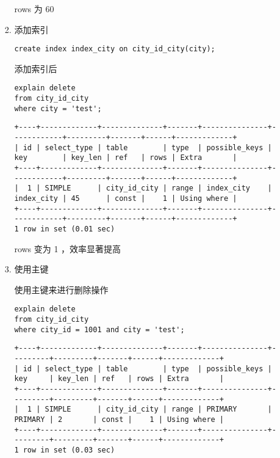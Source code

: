 \documentclass[11pt]{article}
\begin{document}
\begin{itemize}
\begin{enumerate}
\begin{enumerate}
rows 为 60

\item 添加索引

\begin{lstlisting}
create index index_city on city_id_city(city);
\end{lstlisting}

添加索引后

\begin{lstlisting}
explain delete
from city_id_city
where city = 'test';
\end{lstlisting}

\begin{verbatim}
+----+-------------+--------------+-------+---------------+------------+---------+-------+------+-------------+
| id | select_type | table        | type  | possible_keys | key        | key_len | ref   | rows | Extra       |
+----+-------------+--------------+-------+---------------+------------+---------+-------+------+-------------+
|  1 | SIMPLE      | city_id_city | range | index_city    | index_city | 45      | const |    1 | Using where |
+----+-------------+--------------+-------+---------------+------------+---------+-------+------+-------------+
1 row in set (0.01 sec)
\end{verbatim}

rows 变为 1 ，效率显著提高

\item 使用主键

使用主键来进行删除操作

\begin{lstlisting}
explain delete
from city_id_city
where city_id = 1001 and city = 'test';
\end{lstlisting}

\begin{verbatim}
+----+-------------+--------------+-------+---------------+---------+---------+-------+------+-------------+
| id | select_type | table        | type  | possible_keys | key     | key_len | ref   | rows | Extra       |
+----+-------------+--------------+-------+---------------+---------+---------+-------+------+-------------+
|  1 | SIMPLE      | city_id_city | range | PRIMARY       | PRIMARY | 2       | const |    1 | Using where |
+----+-------------+--------------+-------+---------------+---------+---------+-------+------+-------------+
1 row in set (0.03 sec)
\end{verbatim}


\end{enumerate}
\end{enumerate}
\end{itemize}
\end{document}
